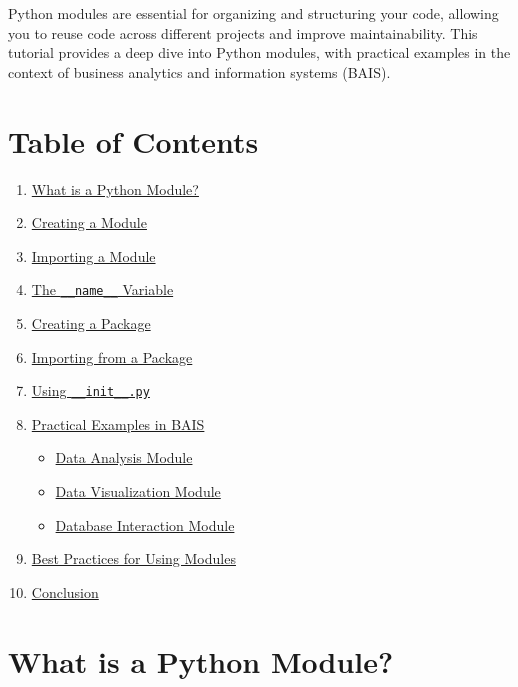 \documentclass[
  letterpaper,
  DIV=11,
  numbers=noendperiod]{scrreprt}
\providecommand{\tightlist}{%
  \setlength{\itemsep}{0pt}\setlength{\parskip}{0pt}}\usepackage{longtable,booktabs,array}
\begin{document}
Python modules are essential for organizing and structuring your code,
allowing you to reuse code across different projects and improve
maintainability. This tutorial provides a deep dive into Python modules,
with practical examples in the context of business analytics and
information systems (BAIS).

\section{Table of Contents}\label{table-of-contents-3}

\begin{enumerate}
\def\labelenumi{\arabic{enumi}.}
\tightlist
\item
  \hyperref[what-is-a-python-module]{What is a Python Module?}
\item
  \hyperref[creating-a-module]{Creating a Module}
\item
  \hyperref[importing-a-module]{Importing a Module}
\item
  \hyperref[the-__name__-variable]{The \texttt{\_\_name\_\_} Variable}
\item
  \hyperref[creating-a-package]{Creating a Package}
\item
  \hyperref[importing-from-a-package]{Importing from a Package}
\item
  \hyperref[using-__init__py]{Using \texttt{\_\_init\_\_.py}}
\item
  \hyperref[practical-examples-in-bais]{Practical Examples in BAIS}

  \begin{itemize}
  \tightlist
  \item
    \hyperref[data-analysis-module]{Data Analysis Module}
  \item
    \hyperref[data-visualization-module]{Data Visualization Module}
  \item
    \hyperref[database-interaction-module]{Database Interaction Module}
  \end{itemize}
\item
  \hyperref[best-practices-for-using-modules]{Best Practices for Using
  Modules}
\item
  \hyperref[conclusion]{Conclusion}
\end{enumerate}

\section{What is a Python Module?}\label{what-is-a-python-module}
\end{document}
